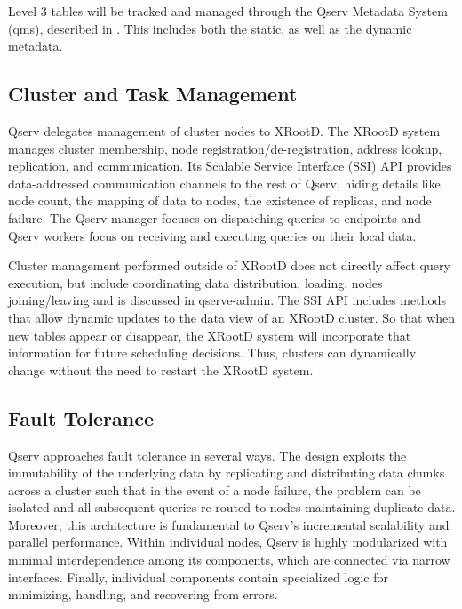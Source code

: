 \documentclass[DM,lsstdraft,toc]{lsstdoc}
\begin{document}
Level 3 tables will be tracked and managed through the Qserv Metadata
System (qms), described in . This
includes both the static, as well as the dynamic metadata.

\subsection{Cluster and Task
Management}\label{cluster-and-task-management}

Qserv delegates management of cluster nodes to
XRootD. The XRootD
system manages cluster membership, node registration/de-registration,
address lookup, replication, and communication. Its Scalable Service
Interface (SSI) API provides data-addressed communication
channels to the rest of Qserv, hiding details like node count, the
mapping of data to nodes, the existence of replicas, and node failure.
The Qserv manager focuses on dispatching queries to endpoints and Qserv
workers focus on receiving and executing queries on their local data.

Cluster management performed outside of XRootD
does not directly affect query execution, but include coordinating data
distribution, loading, nodes joining/leaving and is discussed in
qserve-admin. The SSI API includes methods that allow dynamic
updates to the data view of an XRootD cluster.
So that when new tables appear or disappear, the
XRootD system will incorporate that
information for future scheduling decisions. Thus, clusters can
dynamically change without the need to restart the
XRootD system.

\subsection{Fault Tolerance}\label{fault-tolerance}

Qserv approaches fault tolerance in several ways. The design exploits
the immutability of the underlying data by replicating and distributing
data chunks across a cluster such that in the event of a node failure,
the problem can be isolated and all subsequent queries re-routed to
nodes maintaining duplicate data. Moreover, this architecture is
fundamental to Qserv's incremental scalability and parallel performance.
Within individual nodes, Qserv is highly modularized with minimal
interdependence among its components, which are connected via narrow
interfaces. Finally, individual components contain specialized logic for
minimizing, handling, and recovering from errors.
\end{document}

